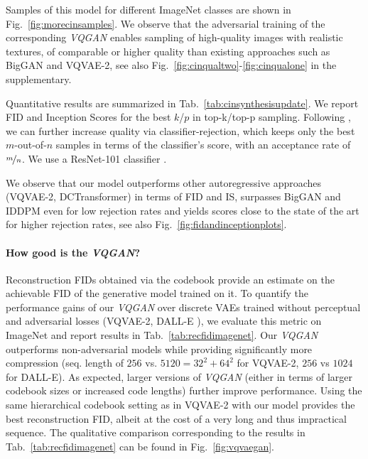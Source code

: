 \documentclass[final]{cvpr}
\begin{document}
Samples of this model for different ImageNet classes are shown in Fig.~\ref{fig:morecinsamples}.
We observe that the adversarial training of the corresponding \emph{VQGAN} enables sampling of
high-quality images with realistic textures, of comparable or higher quality than existing approaches
such as BigGAN and VQVAE-2, see also Fig.~\ref{fig:cinqualtwo}-\ref{fig:cinqualone} in the supplementary. 

\noindent Quantitative results are summarized in Tab.~\ref{tab:cinsynthesisupdate}. We report FID and Inception Scores 
for the best $k$/$p$ in top-k/top-p sampling. Following \cite{razavi2019generating}, we can further
increase quality via classifier-rejection, which keeps only the best $m$-out-of-$n$ samples in terms of
the classifier's score, \ie with an acceptance rate of $\nicefrac{m}{n}$.
We use a ResNet-101 classifier \cite{DBLP:journals/corr/HeZRS15}.

We observe that our model outperforms other autoregressive approaches (VQVAE-2, DCTransformer)
in terms of FID and IS, surpasses BigGAN and IDDPM even for low rejection rates and 
yields scores close to the state of the art for higher rejection rates, see also Fig.~\ref{fig:fidandinceptionplots}. %

%
%
%
%
%
%
%
\vspace{-1.0em}
\paragraph{How good is the \emph{VQGAN}?}
\imagenetreconstruction
Reconstruction FIDs obtained via the codebook provide an estimate on the
achievable FID of the generative model trained on it.
To quantify the performance gains of our \emph{VQGAN} over discrete VAEs 
trained without perceptual and adversarial losses (\eg VQVAE-2, DALL-E \cite{ramesh2021zeroshot}), 
we evaluate this metric on ImageNet and report results in
Tab.~\ref{tab:recfidimagenet}.
Our \emph{VQGAN} outperforms non-adversarial models while providing
significantly more compression (seq. length of $256$ vs. $5120=32^2+64^2$ for VQVAE-2, $256$ vs $1024$ for DALL-E). 
As expected, larger versions of \emph{VQGAN} (either in terms of larger codebook sizes or
increased code lengths) further improve performance. Using the same hierarchical codebook setting as in VQVAE-2 with our model provides the best reconstruction FID, albeit at the cost of a very long and thus impractical sequence. 
\noindent
The qualitative comparison corresponding to the results in
Tab.~\ref{tab:recfidimagenet} can be found in Fig.~\ref{fig:vqvaegan}.
\end{document}
